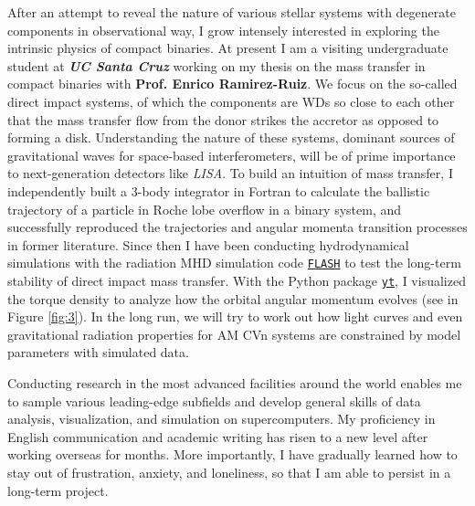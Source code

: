 After an attempt to reveal the nature of various stellar systems with degenerate components in observational way, I grow intensely interested in exploring the intrinsic physics of compact binaries. At present I am a visiting undergraduate student at \textbf{\textit{UC Santa Cruz}} working on my thesis on the mass transfer in compact binaries with \textbf{Prof. Enrico Ramirez-Ruiz}. We focus on the so-called direct impact systems, of which the components are WDs so close to each other that the mass transfer flow from the donor strikes the accretor as opposed to forming a disk. Understanding the nature of these systems, dominant sources of gravitational waves for space-based interferometers, will be of prime importance to next-generation detectors like \textit{LISA}. To build an intuition of mass transfer, I independently built a 3-body integrator in Fortran to calculate the ballistic trajectory of a particle in Roche lobe overflow in a binary system, and successfully reproduced the trajectories and angular momenta transition processes in former literature. Since then I have been conducting hydrodynamical simulations with the radiation MHD simulation code \href{http://flash.uchicago.edu/site/}{\texttt{FLASH}} to test the long-term stability of direct impact mass transfer. With the Python package \href{https://yt-project.org}{\texttt{yt}}, I visualized the torque density to analyze how the orbital angular momentum evolves (see in Figure \ref{fig:3}). In the long run, we will try to work out how light curves and even gravitational radiation properties for AM CVn systems are constrained by model parameters with simulated data.

Conducting research in the most advanced facilities around the world enables me to sample various leading-edge subfields and develop general skills of data analysis, visualization, and simulation on supercomputers. My proficiency in English communication and academic writing has risen to a new level after working overseas for months. More importantly, I have gradually learned how to stay out of frustration, anxiety, and loneliness, so that I am able to persist in a long-term project.
